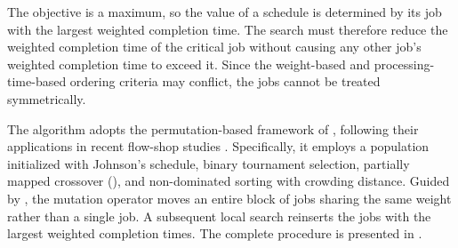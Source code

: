 ﻿\documentclass[12pt]{article}
\begin{document}
\begin{sloppypar}
The objective is a maximum, so the value of a schedule is determined by its job with the largest weighted completion time. 
The search must therefore reduce the weighted completion time of the critical job 
without causing any other job's weighted completion time to exceed it. 
Since the weight-based and processing-time-based ordering criteria may conflict, 
the jobs cannot be treated symmetrically.

The algorithm adopts the permutation-based framework of \citet{qiao2022adaptive}, 
following their applications in recent flow-shop studies \citep{wang2023extended}. 
Specifically, it employs a population initialized with Johnson's schedule, binary tournament selection, 
partially mapped crossover (), and non-dominated sorting with crowding distance. 
Guided by , 
the mutation operator moves an entire block of jobs sharing the same weight rather than a single job. 
A subsequent local search reinserts the jobs with the largest weighted completion times. 
The complete procedure is presented in .

\begin{figure}[H]
\centering
{}
\end{figure}
\end{sloppypar}
\end{document}
